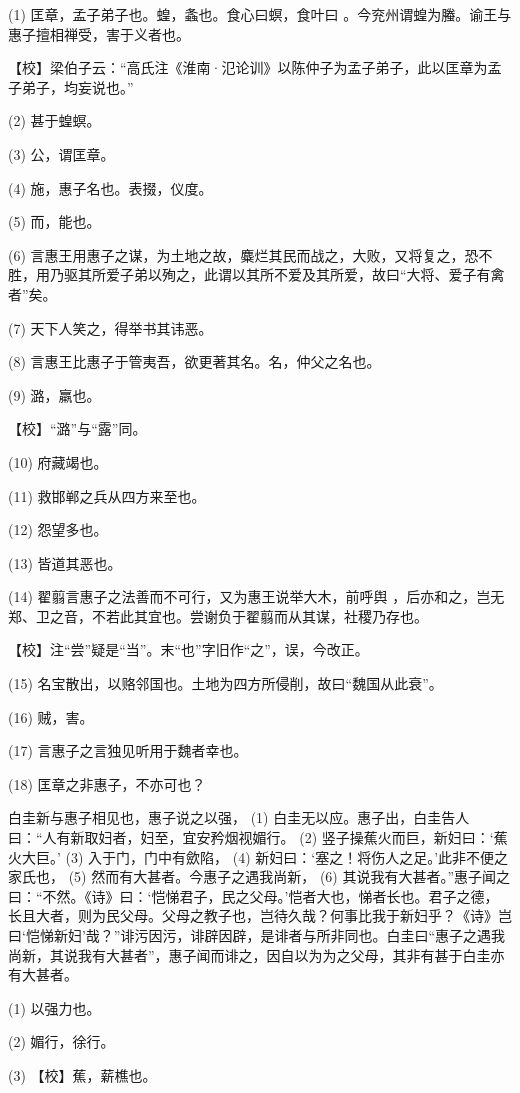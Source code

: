 \documentclass[12pt,UTF8]{ctexbook}
\begin{document}
(1) 匡章，孟子弟子也。蝗，螽也。食心曰螟，食叶曰 。今兖州谓蝗为螣。谕王与惠子擅相禅受，害于义者也。

【校】梁伯子云：“高氏注《淮南·氾论训》以陈仲子为孟子弟子，此以匡章为孟子弟子，均妄说也。”

(2) 甚于蝗螟。

(3) 公，谓匡章。

(4) 施，惠子名也。表掇，仪度。

(5) 而，能也。

(6) 言惠王用惠子之谋，为土地之故，麋烂其民而战之，大败，又将复之，恐不胜，用乃驱其所爱子弟以殉之，此谓以其所不爱及其所爱，故曰“大将、爱子有禽者”矣。

(7) 天下人笑之，得举书其讳恶。

(8) 言惠王比惠子于管夷吾，欲更著其名。名，仲父之名也。

(9) 潞，羸也。

【校】“潞”与“露”同。

(10) 府藏竭也。

(11) 救邯郸之兵从四方来至也。

(12) 怨望多也。

(13) 皆道其恶也。

(14) 翟翦言惠子之法善而不可行，又为惠王说举大木，前呼舆 ，后亦和之，岂无郑、卫之音，不若此其宜也。尝谢负于翟翦而从其谋，社稷乃存也。

【校】注“尝”疑是“当”。末“也”字旧作“之”，误，今改正。

(15) 名宝散出，以赂邻国也。土地为四方所侵削，故曰“魏国从此衰”。

(16) 贼，害。

(17) 言惠子之言独见听用于魏者幸也。

(18) 匡章之非惠子，不亦可也？

白圭新与惠子相见也，惠子说之以强， (1) 白圭无以应。惠子出，白圭告人曰：“人有新取妇者，妇至，宜安矜烟视媚行。 (2) 竖子操蕉火而巨，新妇曰：‘蕉火大巨。’ (3) 入于门，门中有歛陷， (4) 新妇曰：‘塞之！将伤人之足。’此非不便之家氏也， (5) 然而有大甚者。今惠子之遇我尚新， (6) 其说我有大甚者。”惠子闻之曰：“不然。《诗》曰：‘恺悌君子，民之父母。’恺者大也，悌者长也。君子之德，长且大者，则为民父母。父母之教子也，岂待久哉？何事比我于新妇乎？《诗》岂曰‘恺悌新妇’哉？”诽污因污，诽辟因辟，是诽者与所非同也。白圭曰“惠子之遇我尚新，其说我有大甚者”，惠子闻而诽之，因自以为为之父母，其非有甚于白圭亦有大甚者。

(1) 以强力也。

(2) 媚行，徐行。

(3) 【校】蕉，薪樵也。
\end{document}
